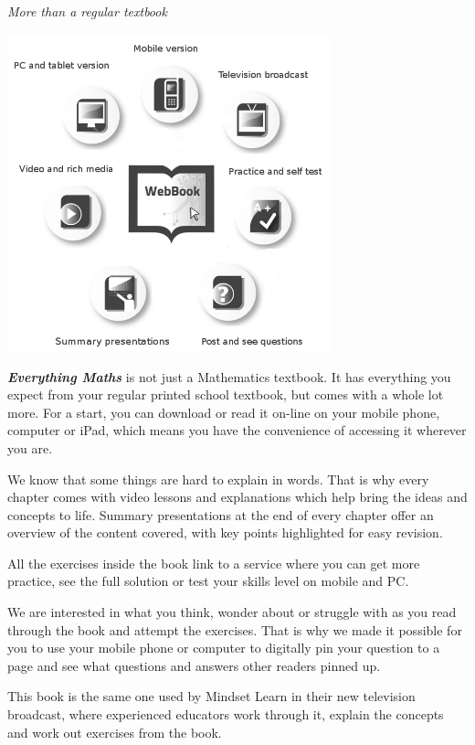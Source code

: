 
\newpage
\thispagestyle{empty}

{\normalfont\sffamily\fontsize{22}\normalfont\itshape More than a regular textbook} \par

\begin{center}
\includegraphics[width=0.70\textwidth]{title_images/morethantextbook.png}
\end{center}

\par
{\Large
\textbf{\textit{Everything Maths}} is not just a Mathematics textbook. It has everything you expect from
your regular printed school textbook, but comes with a whole lot more. For a start, you can download or read it
on-line on your mobile phone, computer or iPad, which means you have the convenience of accessing
it wherever you are.\par


We know that some things are hard to explain in words. That is why every chapter comes with video
lessons and explanations which help bring the ideas and concepts to life. Summary presentations at
the end of every chapter offer an overview of the content covered, with key points highlighted for easy
revision.\par


All the exercises inside the book link to a service where you can get more practice, see the full solution
or test your skills level on mobile and PC.\par


We are interested in what you think, wonder about or struggle with as you read through the book and
attempt the exercises. That is why we made it possible for you to use your mobile phone or computer to
digitally pin your question to a page and see what questions and answers other readers pinned up.\par


This book is the same one used by Mindset Learn in their new television broadcast, where experienced educators work through it, explain the concepts and work out exercises from the book.
}





